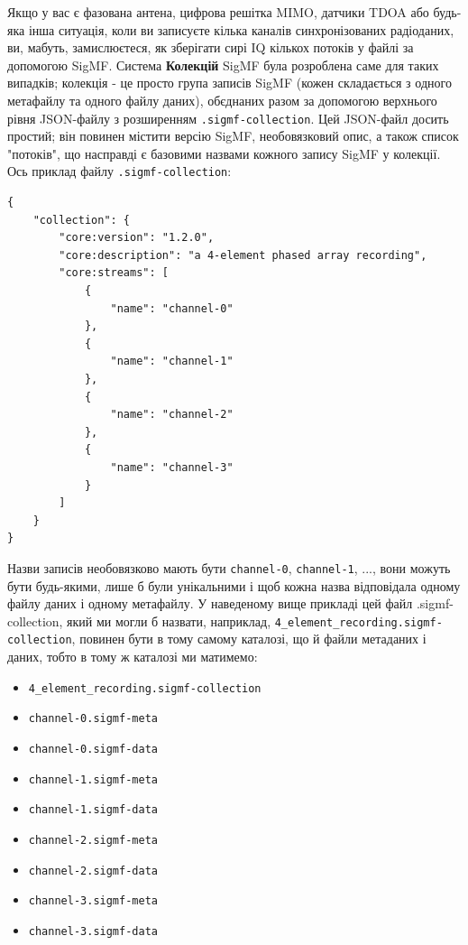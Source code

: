 Якщо у вас є фазована антена, цифрова решітка MIMO, датчики TDOA або
будь-яка інша ситуація, коли ви записуєте кілька каналів синхронізованих
радіоданих, ви, мабуть, замислюєтеся, як зберігати сирі IQ кількох
потоків у файлі за допомогою SigMF. Система \textbf{Колекцій} SigMF була
розроблена саме для таких випадків; колекція - це просто група записів
SigMF (кожен складається з одного метафайлу та одного файлу даних),
об\textquotesingle єднаних разом за допомогою верхнього рівня JSON-файлу
з розширенням \texttt{.sigmf-collection}. Цей JSON-файл досить простий;
він повинен містити версію SigMF, необов\textquotesingle язковий опис, а
також список "потоків", що насправді є базовими назвами кожного запису
SigMF у колекції. Ось приклад файлу \texttt{.sigmf-collection}:

\begin{Verbatim}[breaklines=true,breakanywhere=true,fontsize=\small]
{
    "collection": {
        "core:version": "1.2.0",
        "core:description": "a 4-element phased array recording",
        "core:streams": [
            {
                "name": "channel-0"
            },
            {
                "name": "channel-1"
            },
            {
                "name": "channel-2"
            },
            {
                "name": "channel-3"
            }
        ]
    }
}
\end{Verbatim}

Назви записів необов\textquotesingle язково мають бути
\texttt{channel-0}, \texttt{channel-1}, ..., вони можуть бути
будь-якими, лише б були унікальними і щоб кожна назва відповідала одному
файлу даних і одному метафайлу. У наведеному вище прикладі цей файл
.sigmf-collection, який ми могли б назвати, наприклад,
\texttt{4\_element\_recording.sigmf-collection}, повинен бути в тому
самому каталозі, що й файли метаданих і даних, тобто в тому ж каталозі
ми матимемо:

\begin{itemize}
\tightlist
\item
  \texttt{4\_element\_recording.sigmf-collection}
\item
  \texttt{channel-0.sigmf-meta}
\item
  \texttt{channel-0.sigmf-data}
\item
  \texttt{channel-1.sigmf-meta}
\item
  \texttt{channel-1.sigmf-data}
\item
  \texttt{channel-2.sigmf-meta}
\item
  \texttt{channel-2.sigmf-data}
\item
  \texttt{channel-3.sigmf-meta}
\item
  \texttt{channel-3.sigmf-data}
\end{itemize}

